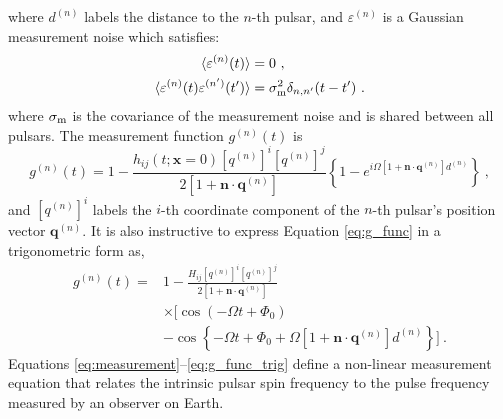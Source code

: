 \documentclass[fleqn,usenatbib,useAMS]{mnras}
\begin{document}
where $d^{(n)}$ labels the distance to the $n$-th pulsar, and $\varepsilon^{(n)}$ is a Gaussian measurement noise which satisfies: 
\begin{align}
	\langle \varepsilon^{(n)}(t) \rangle &= 0 \ , \\
	\langle \varepsilon^{(n)}(t) \varepsilon^{(n')}(t') \rangle &= \sigma_{\rm m}^2 \delta_{n,n'}(t - t') \ .	\label{eq:vareps}
\end{align}
where $\sigma_{\rm m}$ is the covariance of the measurement noise and is shared between all pulsars. The measurement function $g^{(n)}(t)$ is
\begin{equation}
	g^{(n)}(t) = 1 - \frac{h_{ij} (t; \boldsymbol{x}= 0)[q^{(n)}]^i [q^{(n)}]^j}{2[1 + \boldsymbol{n}\cdot \boldsymbol{q}^{(n)}] }  \left \{1 -e^{i \Omega \left[1 + \boldsymbol{n}\cdot \boldsymbol{q}^{(n)} \right]  d^{(n)}}\right \} \ ,
	\label{eq:g_func}
\end{equation}
and $[q^{(n)}]^i$ labels the $i$-th coordinate component of the $n$-th pulsar's position vector $\boldsymbol{q}^{(n)}$. It is also instructive to express Equation \eqref{eq:g_func} in a trigonometric form as,
\begin{align}
	g^{(n)}(t) =& 1 - \frac{ H_{ij}[q^{(n)}]^i [q^{(n)}]^j }{2 [1 + \boldsymbol{n}\cdot \boldsymbol{q}^{(n)}] } \nonumber \\
	& \times \Big[\cos\left(-\Omega t +\Phi_0\right) \nonumber \\
	&- \cos \left \{-\Omega t +\Phi_0 + \Omega \left[1 + \boldsymbol{n}\cdot \boldsymbol{q}^{(n)} \right]  d^{(n)} \right \} \Big ] \ .
	\label{eq:g_func_trig}
\end{align}
Equations \eqref{eq:measurement}--\eqref{eq:g_func_trig}  define a non-linear measurement equation that relates the intrinsic pulsar spin frequency to the pulse frequency measured by an observer on Earth. 
\end{document}
